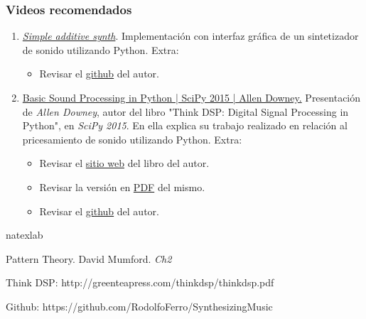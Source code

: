 \documentclass[a4paper]{article}
\begin{document}
\subsubsection{\sffamily Videos recomendados}
\begin{enumerate}
\item \href{http://www.youtube.com/watch?v=PU8M0eIqgy4}{\textit{Simple additive synth}}. Implementación con interfaz gráfica de un sintetizador de sonido utilizando Python. Extra:
\begin{itemize}
\item Revisar el \href{https://github.com/Penguinum/python-synth}{github} del autor.
\end{itemize}
\item \href{http://www.youtube.com/watch?v=0ALKGR0I5MA}{Basic Sound Processing in Python | SciPy 2015 | Allen Downey.} Presentación de \textit{Allen Downey}, autor del libro "Think DSP: Digital Signal Processing in Python", en \textit{SciPy 2015}. En ella explica su trabajo realizado en relación al pricesamiento de sonido utilizando Python. Extra:
\begin{itemize}
\item Revisar el \href{http://greenteapress.com/thinkdsp/html/index.html}{sitio web} del libro del autor.
\item Revisar la versión en \href{http://greenteapress.com/thinkdsp/thinkdsp.pdf}{PDF} del mismo.
\item Revisar el \href{https://github.com/AllenDowney/ThinkDSP}{github} del autor.
\end{itemize}
\end{enumerate}

\begin{thebibliography}{96}
\expandafter\ifx\csname
natexlab\endcsname\relax\def\natexlab#1{#1}\fi

Pattern Theory. David Mumford. \textit{Ch2}

Think DSP: http://greenteapress.com/thinkdsp/thinkdsp.pdf

Github: https://github.com/RodolfoFerro/SynthesizingMusic

\end{thebibliography}
\end{document}
